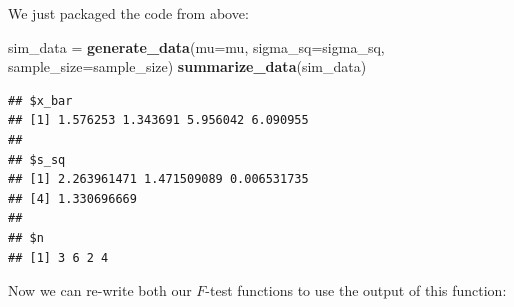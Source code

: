 \documentclass[
]{book}
\newenvironment{Shaded}{\begin{snugshade}}{\end{snugshade}}
\newcommand{\AttributeTok}[1]{\textcolor[rgb]{0.13,0.29,0.53}{#1}}
\newcommand{\ControlFlowTok}[1]{\textcolor[rgb]{0.13,0.29,0.53}{\textbf{#1}}}
\newcommand{\FunctionTok}[1]{\textcolor[rgb]{0.13,0.29,0.53}{\textbf{#1}}}
\newcommand{\NormalTok}[1]{#1}
\newcommand{\OtherTok}[1]{\textcolor[rgb]{0.56,0.35,0.01}{#1}}
\newcommand{\SpecialCharTok}[1]{\textcolor[rgb]{0.81,0.36,0.00}{\textbf{#1}}}
\begin{document}
\begin{Shaded}
\end{Shaded}

We just packaged the code from above:

\begin{Shaded}
\begin{Highlighting}[]
\NormalTok{sim\_data }\OtherTok{=} \FunctionTok{generate\_data}\NormalTok{(}\AttributeTok{mu=}\NormalTok{mu, }\AttributeTok{sigma\_sq=}\NormalTok{sigma\_sq, }\AttributeTok{sample\_size=}\NormalTok{sample\_size)}
\FunctionTok{summarize\_data}\NormalTok{(sim\_data)}
\end{Highlighting}
\end{Shaded}

\begin{verbatim}
## $x_bar
## [1] 1.576253 1.343691 5.956042 6.090955
## 
## $s_sq
## [1] 2.263961471 1.471509089 0.006531735
## [4] 1.330696669
## 
## $n
## [1] 3 6 2 4
\end{verbatim}

Now we can re-write both our \(F\)-test functions to use the output of this function:
\end{document}

